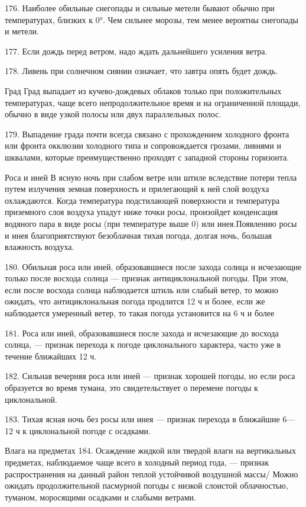 176. Наиболее обильные снегопады и сильные метели бывают обычно при температурах, близких к 0°. Чем сильнее морозы, тем менее вероятны снегопады и метели.

177. Если дождь перед ветром, надо ждать дальнейшего усиления ветра.

178. Ливень при солнечном сиянии означает, что завтра опять будет дождь.

Град
Град выпадает из кучево-дождевых облаков только при положительных температурах, чаще всего непродолжительное время и на ограниченной площади, обычно в виде узкой полосы или двух параллельных полос.

179. Выпадение града почти всегда связано с прохождением холодного фронта или фронта окклюзии холодного типа и сопровождается грозами, ливнями и шквалами, которые преимущественно проходят с западной стороны горизонта.

Роса и иней
В ясную ночь при слабом ветре или штиле вследствие потери тепла путем излучения земная поверхность и прилегающий к ней слой воздуха охлаждаются. Когда температура подстилающей поверхности и температура приземного слоя воздуха упадут ниже точки росы, произойдет конденсация водяного пара в виде росы (при температуре выше 0) или инея.Появлению росы и инея благоприятствуют безоблачная тихая погода, долгая ночь, большая влажность воздуха.

180. Обильная роса или иней, образовавшиеся после захода солнца и исчезающие только после восхода солнца — признак антициклональной погоды. При этом, если после восхода солнца наблюдается штиль или слабый ветер, то можно ожидать, что антициклональная погода продлится 12 ч и более, если же наблюдается умеренный ветер, то такая погода установится на 6 ч и более

181. Роса или иней, образовавшиеся после захода и исчезающие до восхода солнца, — признак перехода к погоде циклонального характера, часто уже в течение ближайших 12 ч.

182. Сильная вечерняя роса или иней --- признак хорошей погоды, но если роса образуется во время тумана, это свидетельствует о перемене погоды к циклональной.

183. Тихая ясная ночь без росы или инея — признак перехода в ближайшие 6—12 ч к циклональной погоде с осадками.

Влага на предметах
184. Осаждение жидкой или твердой влаги на вертикальных предметах, наблюдаемое чаще всего в холодный период года, — признак распространения на данный район теплой устойчивой воздушной массы/ Можно ожидать продолжительной пасмурной погоды с низкой слоистой облачностью, туманом, моросящими осадками и слабыми ветрами.

